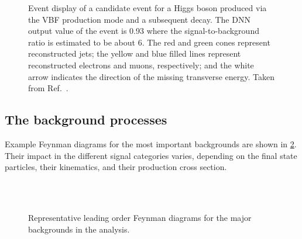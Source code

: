 \begin{figure}
    {}
    {}
    \caption{Event display of a candidate event for a Higgs boson produced via the VBF production mode and a subsequent \HWWdet decay. The DNN output value of the event is 0.93 where the signal-to-background ratio is estimated to be about 6. 
    The red and green cones represent reconstructed jets; the yellow and blue filled lines represent reconstructed electrons and muons, respectively; and the white arrow indicates the direction of the missing transverse energy. 
    Taken from Ref.~\cite{HWWPaper}.}
    \label{fig:vbf-event-display}
\end{figure}

\subsection{The background processes}
Example Feynman diagrams for the most important backgrounds are shown in \cref{fig:hww:feyn-bkgs}.
Their impact in the different signal categories varies, depending on the final state particles, their kinematics, and their production cross section. 
\begin{figure}[ht]
     \hspace{5em}
     \\
     \hspace{5em}
     \\
     \hspace{5em}
    \caption{Representative leading order Feynman diagrams for the major backgrounds in the \HWW analysis.} 
    \label{fig:hww:feyn-bkgs}
\end{figure}

